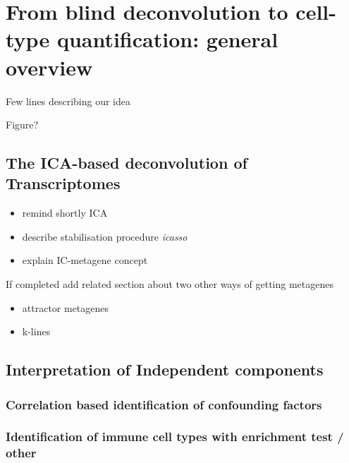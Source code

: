 \documentclass[12pt,]{book}
\providecommand{\tightlist}{%
  \setlength{\itemsep}{0pt}\setlength{\parskip}{0pt}}
\theoremstyle{definition}
\theoremstyle{definition}
\theoremstyle{definition}
\theoremstyle{remark}
\begin{document}
\hypertarget{from-blind-deconvolution-to-cell-type-quantification-general-overview}{%
\section{From blind deconvolution to cell-type quantification: general
overview}\label{from-blind-deconvolution-to-cell-type-quantification-general-overview}}

Few lines describing our idea

Figure?

\hypertarget{the-ica-based-deconvolution-of-transcriptomes}{%
\subsection{The ICA-based deconvolution of
Transcriptomes}\label{the-ica-based-deconvolution-of-transcriptomes}}

\begin{itemize}
\tightlist
\item
  remind shortly ICA
\item
  describe stabilisation procedure \emph{icasso}
\item
  explain IC-metagene concept
\end{itemize}

If completed add related section about two other ways of getting
metagenes

\begin{itemize}
\tightlist
\item
  attractor metagenes
\item
  k-lines
\end{itemize}

\hypertarget{interpretation-of-independent-components}{%
\subsection{Interpretation of Independent
components}\label{interpretation-of-independent-components}}

\hypertarget{correlation-based-identification-of-confounding-factors}{%
\subsubsection{Correlation based identification of confounding
factors}\label{correlation-based-identification-of-confounding-factors}}

\hypertarget{identification-of-immune-cell-types-with-enrichment-test-other}{%
\subsubsection{Identification of immune cell types with enrichment test
/
other}\label{identification-of-immune-cell-types-with-enrichment-test-other}}
\end{document}

